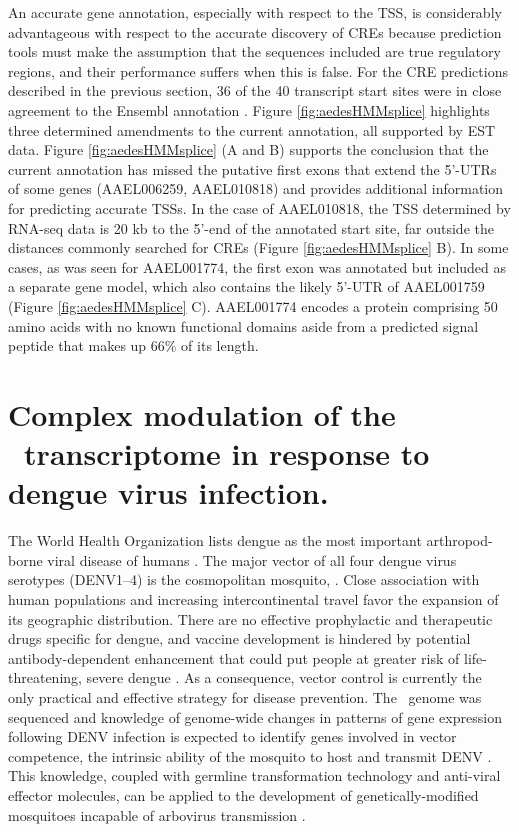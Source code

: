An accurate gene annotation, especially with respect to the \gls{TSS}, is considerably advantageous with respect to the accurate discovery of \glspl{CRE} because prediction tools must make the assumption that the sequences included are true regulatory regions, and their performance suffers when this is false. For the \gls{CRE} predictions described in the previous section, 36 of the 40 transcript start sites were in close agreement to the Ensembl annotation \cite{Hubbard2002}. Figure \ref{fig:aedesHMMsplice} highlights three determined amendments to the current annotation, all supported by EST data. Figure \ref{fig:aedesHMMsplice} (A and B) supports the conclusion that the current annotation has missed the putative first exons that extend the 5'-UTRs of some genes (AAEL006259, AAEL010818) and provides additional information for predicting accurate \glspl{TSS}. In the case of AAEL010818, the \gls{TSS} determined by RNA-seq data is 20 kb to the 5'-end of the annotated start site, far outside the distances commonly searched for \glspl{CRE} (Figure \ref{fig:aedesHMMsplice} B). In some cases, as was seen for AAEL001774, the first exon was annotated but included as a separate gene model, which also contains the likely 5'-UTR of AAEL001759 (Figure \ref{fig:aedesHMMsplice} C). AAEL001774 encodes a protein comprising 50 amino acids with no known functional domains aside from a predicted signal peptide that makes up 66\% of its length.










\pagebreak
\section{Complex modulation of the \Aea\ transcriptome in response to dengue virus infection. \cite{bonizzoni2012complex}}


The World Health Organization lists dengue as the most important arthropod-borne viral disease of humans \cite{WHO2009}.
The major vector of all four dengue virus serotypes (\gls{DENV}1–4) is the cosmopolitan mosquito, \Aea.
Close association with human populations and increasing intercontinental travel favor the expansion of its geographic distribution.
There are no effective prophylactic and therapeutic drugs specific for dengue, and vaccine development is hindered by potential antibody-dependent enhancement that could put people at greater risk of life-threatening, severe dengue \cite{Gubler2002}.
As a consequence, vector control is currently the only practical and effective strategy for disease prevention.
The \Aa\ genome was sequenced and knowledge of genome-wide changes in patterns of gene expression following \gls{DENV} infection is expected to identify genes involved in vector competence, the intrinsic ability of the mosquito to host and transmit \gls{DENV} \cite{Nene2007,Kramer2003}.
This knowledge, coupled with germline transformation technology and anti-viral effector molecules, can be applied to the development of genetically-modified mosquitoes incapable of arbovirus transmission \cite{James2007,Franz2006,Mathur2010}.

